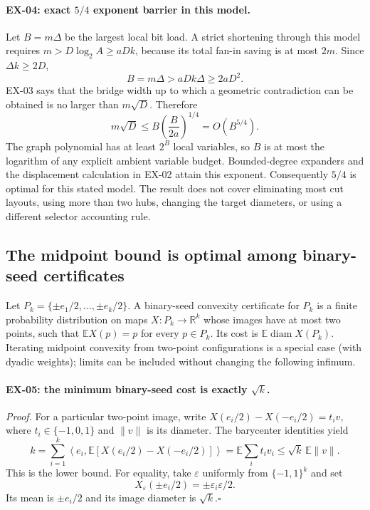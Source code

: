 \paragraph{EX-04: exact $5/4$ exponent barrier in this model.}
Let $B=m\Delta$ be the largest local bit load.  A strict shortening through this
model requires $m>D\log_2 A\geq aDk$, because its total fan-in saving is at most
$2m$.  Since $\Delta k\geq2D$,
\[
 B=m\Delta> aDk\Delta\geq2aD^2.
\]
EX-03 says that the bridge width up to which a geometric contradiction can be
obtained is no larger than $m\sqrt D$.  Therefore
\[
 m\sqrt D\leq B\left(\frac{B}{2a}\right)^{1/4}
 =O(B^{5/4}).
\]
The graph polynomial has at least $2^B$ local variables, so $B$ is at most the
logarithm of any explicit ambient variable budget.  Bounded-degree expanders
and the displacement calculation in EX-02 attain this exponent.  Consequently
$5/4$ is optimal for this stated model.  The result does not cover eliminating
most cut layouts, using more than two hubs, changing the target diameters, or
using a different selector accounting rule.

\subsection{The midpoint bound is optimal among binary-seed certificates}
\label{sec:ex-midpoint}

Let $P_k=\{\pm e_1/2,\ldots,\pm e_k/2\}$.  A binary-seed convexity certificate
for $P_k$ is a finite probability distribution on maps $X:P_k\to\mathbb R^k$
whose images have at most two points, such that $\mathbb E X(p)=p$ for every
$p\in P_k$.  Its cost is $\mathbb E\operatorname{diam}X(P_k)$.  Iterating
midpoint convexity from two-point configurations is a special case (with dyadic
weights); limits can be included without changing the following infimum.

\paragraph{EX-05: the minimum binary-seed cost is exactly $\sqrt k$.}
\emph{Proof.}
For a particular two-point image, write
$X(e_i/2)-X(-e_i/2)=t_i v$, where $t_i\in\{-1,0,1\}$ and $\|v\|$ is its
diameter.  The barycenter identities yield
\[
 k=\sum_{i=1}^k\left\langle e_i,
   \mathbb E[X(e_i/2)-X(-e_i/2)]\right\rangle
 =\mathbb E\sum_i t_i v_i
 \leq\sqrt{k}\,\mathbb E\|v\|.
\]
This is the lower bound.  For equality, take $\varepsilon$ uniformly from
$\{-1,1\}^k$ and set
\[
 X_\varepsilon(\pm e_i/2)=\pm\varepsilon_i\varepsilon/2.
\]
Its mean is $\pm e_i/2$ and its image diameter is $\sqrt k$.\hfill$\square$

